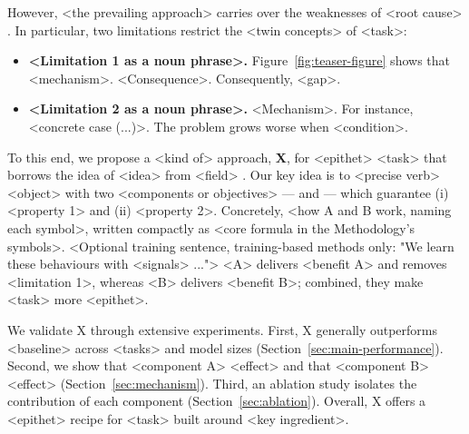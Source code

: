 However, <the prevailing approach> carries over the weaknesses of <root cause> \citep{Placeholder-B}.
In particular, two limitations restrict the <twin concepts> of <task>:
\begin{itemize}[leftmargin=*]
    \item \textbf{<Limitation 1 as a noun phrase>.} Figure~\ref{fig:teaser-figure} shows that <mechanism>. <Consequence>. Consequently, <gap>.
    \item \textbf{<Limitation 2 as a noun phrase>.} <Mechanism>. For instance, <concrete case (\eg ...)>. The problem grows worse when <condition>.
\end{itemize}

To this end, we propose a <kind of> approach, \textbf{X}, for <epithet> <task> that borrows the idea of <idea> from <field> \citep{Placeholder-C}.
Our key idea is to <precise verb> <object> with two <components or objectives> ---  and  --- which guarantee (i) <property 1> and (ii) <property 2>.
Concretely, <how A and B work, naming each symbol>, written compactly as <core formula in the Methodology's symbols>.
<Optional training sentence, training-based methods only: "We learn these behaviours with <signals> ...">
<A> delivers <benefit A> and removes <limitation 1>, whereas <B> delivers <benefit B>; combined, they make <task> more <epithet>.

We validate X through extensive experiments.
First, X generally outperforms <baseline> across <tasks> and model sizes (\cf Section~\ref{sec:main-performance}).
Second, we show that <component A> <effect> and that <component B> <effect> (\cf Section~\ref{sec:mechanism}).
Third, an ablation study isolates the contribution of each component (\cf Section~\ref{sec:ablation}).
Overall, X offers a <epithet> recipe for <task> built around <key ingredient>.
